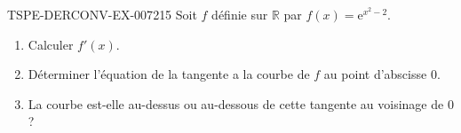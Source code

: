 \begin{exercice}{TSPE-DERCONV-EX-007}{2}{15}
Soit $f$ définie sur $\mathbb{R}$ par $f(x) = \mathrm{e}^{x^2 - 2}$.
\begin{enumerate}
  \item Calculer $f'(x)$.
  \item Déterminer l'équation de la tangente a la courbe de $f$ au point d'abscisse $0$.
  \item La courbe est-elle au-dessus ou au-dessous de cette tangente au voisinage de $0$ ?
\end{enumerate}

\end{exercice}
